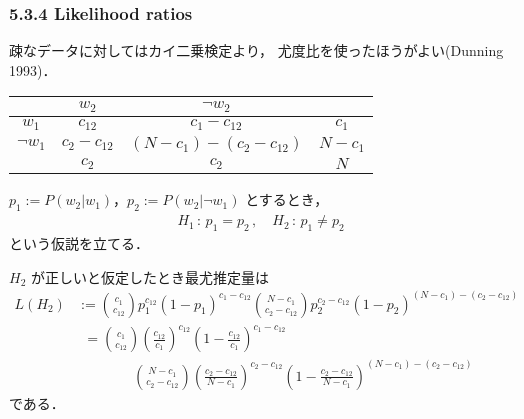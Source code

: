 \documentclass[9pt,leqno]{beamer}
\begin{document}
\begin{frame}
    \frametitle{5.3.4 Likelihood ratios}
    疎なデータに対してはカイ二乗検定より，
    尤度比を使ったほうがよい(Dunning 1993)．
    \begin{table}
        \begin{tabular}{|c|c|c|c|}
            \hline
                          &    $w_2$       &  $\lnot w_2$                                      &   \\
            \hline
            $w_1$         &   $c_{12}$     & $c_1 - c_{12}$                                    &   $c_1$ \\
            \hline
            $\lnot{w_1}$  & $c_2 - c_{12}$ & $\left(N -c_1\right) - \left(c_2 - c_{12}\right)$ &  $N - c_1$ \\
            \hline
                          &     $c_2$      &     $c_2$                                         &    $N$ \\
            \hline
        \end{tabular}
    \end{table}
    $p_1 := P(w_2 | w_1)$，$p_2 := P(w_2 | \lnot w_1)$ とするとき，
    \begin{align*}
        H_1 \,:\, p_1 = p_2\,,\quad H_2 \,:\, p_1 \neq p_2
    \end{align*}
    という仮説を立てる．
    
    $H_2$ が正しいと仮定したとき最尤推定量は
    \begin{align*}
        L(H_2) &:= \binom{c_1}{c_{12}}p_1^{c_{12}}(1 - p_1)^{c_1 - c_{12}}
        \binom{ N - c_1}{c_2 - c_{12}}p_2^{c_2 - c_{12}}(1 - p_2)^{(N - c_1) - (c_2 - c_{12})} \\
        & \phantom{:} = \binom{c_1}{c_{12}}\left(\frac{c_{12}}{c_1}\right)^{c_{12}}\left(1 - \frac{c_{12}}{c_1}\right)^{c_1 - c_{12}} \\
        & \qquad \qquad \binom{ N - c_1}{c_2 - c_{12}}\left(\frac{c_2 - c_{12}}{N - c_1}\right)^{c_2 - c_{12}}\left(1 - \frac{c_2 - c_{12}}{N - c_1}\right)^{(N - c_1) - (c_2 - c_{12})}
    \end{align*}
    である．
\end{frame}
\end{document}
